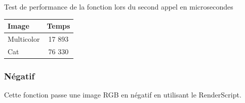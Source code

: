 \documentclass{article}
\begin{document}
\begin{center}
\medbreak
Test de performance de la fonction lors du second appel en microsecondes
\bigbreak
   \begin{tabular}{ | l | c | }
     \hline
     Image & Temps \\
     \hline
     Multicolor & 17 893 \\
     \hline
     Cat & 76 330 \\
     \hline
   \end{tabular}
 \end{center}
\bigbreak

\subsubsection{Négatif}

Cette fonction passe une image RGB en négatif en utilisant le RenderScript.
\end{document}
